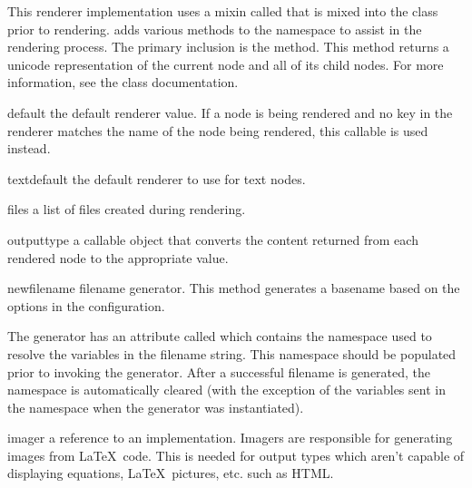\documentclass{manual}
\begin{document}
This renderer implementation uses a mixin called  that
is mixed into the  class prior to rendering.  
adds various methods to the  namespace to assist in the
rendering process.  The primary inclusion is the 
method.  This method returns a unicode representation of the current node
and all of its child nodes.  For more information, see the 
class documentation.

\begin{memberdesc}[Renderer]{default}
the default renderer value.  If a node is being rendered and no key in
the renderer matches the name of the node being rendered, this 
callable is used instead.
\end{memberdesc}

\begin{memberdesc}[Renderer]{textdefault}
the default renderer to use for text nodes.
\end{memberdesc}

\begin{memberdesc}[Renderer]{files}
a list of files created during rendering.
\end{memberdesc}

\begin{memberdesc}[Renderer]{outputtype}
a callable object that converts the content returned from each rendered
node to the appropriate value.
\end{memberdesc}

\begin{memberdesc}[Renderer]{newfilename}
filename generator.  This method generates a basename based on the options
in the configuration.  

The generator has an attribute called  which contains the
namespace used to resolve the variables in the filename string.  This
namespace should be populated prior to invoking the generator.  After
a successful filename is generated, the namespace is automatically cleared
(with the exception of the variables sent in the namespace when the 
generator was instantiated).

\end{memberdesc}

\begin{memberdesc}[Renderer]{imager}
a reference to an  implementation.  Imagers are responsible
for generating images from \LaTeX\ code.  This is needed for output types 
which aren't capable of displaying equations, \LaTeX\ pictures, etc. such
as HTML.
\end{memberdesc}
\end{document}
